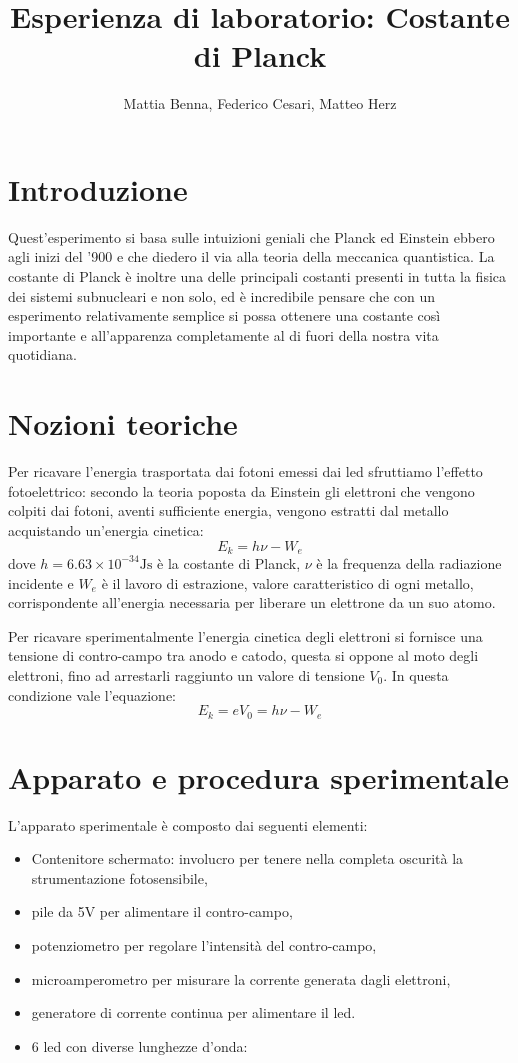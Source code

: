 \documentclass[9pt,a4paper,twocolumn,twoside]{tau-class/tau}
\title{Esperienza di laboratorio: Costante di Planck}
\author[b,c,3]{Mattia Benna, Federico Cesari, Matteo Herz}
\begin{document}
		
    \maketitle 
    \thispagestyle{firststyle} 
    \tauabstract
    
\vspace{-0.8cm}
\section{Introduzione}
Quest'esperimento si basa sulle intuizioni geniali che Planck ed Einstein ebbero agli inizi del '900 e che diedero il via alla teoria della meccanica quantistica. La costante di Planck è inoltre una delle principali costanti presenti in tutta la fisica dei sistemi subnucleari e non solo, ed è incredibile pensare che con un esperimento relativamente semplice si possa ottenere una costante così importante e all'apparenza completamente al di fuori della nostra vita quotidiana.


\section{Nozioni teoriche}
Per ricavare l'energia trasportata dai fotoni emessi dai led sfruttiamo l'effetto fotoelettrico: secondo la teoria poposta da Einstein gli elettroni che vengono colpiti dai fotoni, aventi sufficiente energia, vengono estratti dal metallo acquistando un'energia cinetica:
\[
    E_k= h \nu - W_e
\]
dove \(h = 6.63 \times 10^{-34} \text{Js}\) è la costante di Planck, \(\nu\) è la frequenza della radiazione incidente  e \(W_e\) è il lavoro di estrazione, valore caratteristico di ogni metallo, corrispondente all'energia necessaria per liberare un elettrone da un suo atomo.

Per ricavare sperimentalmente l'energia cinetica degli elettroni si fornisce una tensione di contro-campo tra anodo e catodo, questa si oppone al moto degli elettroni, fino ad arrestarli raggiunto un valore di tensione \(V_0\). In questa condizione vale l'equazione:
\[
    E_k  = e V_0  = h\nu - W_e
\]

\section{Apparato e procedura sperimentale}

L'apparato sperimentale è composto dai seguenti elementi:
\begin{itemize}
    \item Contenitore schermato: involucro per tenere nella completa oscurità la strumentazione fotosensibile,
    \item pile da 5V per alimentare il contro-campo,
    \item potenziometro per regolare l'intensità del contro-campo,
    \item microamperometro per misurare la corrente generata dagli elettroni,
    \item generatore di corrente continua per alimentare il led.
    \item 6 led con diverse lunghezze d'onda:
\end{itemize}
\end{document}
